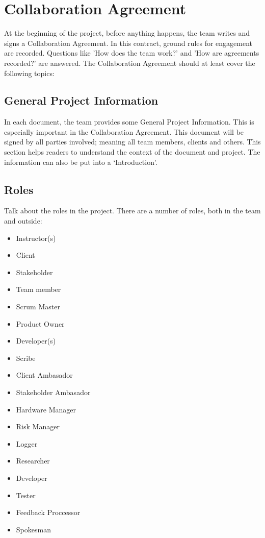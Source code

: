 \documentclass[10pt]{report}
\begin{document}
\newpage

\section{Collaboration Agreement}

At the beginning of the project, before anything happens, the team writes and signs a Collaboration Agreement. In this contract, ground rules for engagement are recorded. Questions like 'How does the team work?' and 'How are agreements recorded?' are answered. The Collaboration Agreement should at least cover the following topics:

\subsection{General Project Information}

In each document, the team provides some General Project Information. This is especially important in the Collaboration Agreement. This document will be signed by all parties involved; meaning all team members, clients and others. This section helps readers to understand the context of the document and project. The information can also be put into a `Introduction'.

\subsection{Roles}

Talk about the roles in the project. There are a number of roles, both in the team and outside:

\begin{itemize}
	\item Instructor(s)
	\item Client
	\item Stakeholder
	\item Team member
	\item Scrum Master
	\item Product Owner
	\item Developer(s)
	\item Scribe
	\item Client Ambasador
	\item Stakeholder Ambasador
	\item Hardware Manager
	\item Risk Manager
	\item Logger
	\item Researcher
	\item Developer
	\item Tester
	\item Feedback Proccessor
	\item Spokesman
\end{itemize}
\end{document}
